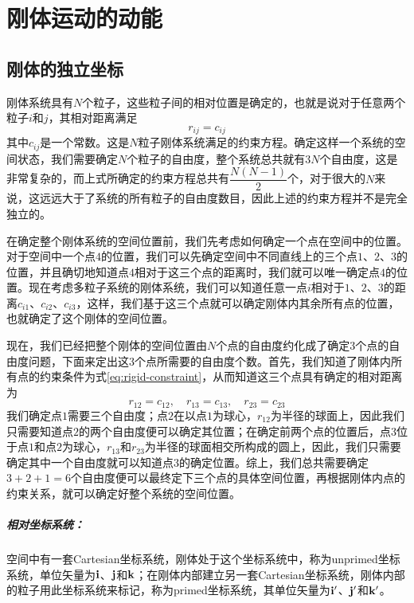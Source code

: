 \chapter{刚体运动的动能}

\section{刚体的独立坐标}

刚体系统具有$N$个粒子，这些粒子间的相对位置是确定的，也就是说对于任意两个粒子$i$和$j$，其相对距离满足
\begin{equation}
	r_{ij} = c_{ij}	\label{eq:rigid-constraint}
\end{equation} 
其中$c_{ij}$是一个常数。这是$N$粒子刚体系统满足的约束方程。确定这样一个系统的空间状态，我们需要确定$N$个粒子的自由度，整个系统总共就有$3N$个自由度，这是非常复杂的，而上式所确定的约束方程总共有$\dfrac{N(N-1)}{2}$个，对于很大的$N$来说，这远远大于了系统的所有粒子的自由度数目，因此上述的约束方程并不是完全独立的。

在确定整个刚体系统的空间位置前，我们先考虑如何确定一个点在空间中的位置。对于空间中一个点$4$的位置，我们可以先确定空间中不同直线上的三个点$1$、$2$、$3$的位置，并且确切地知道点$4$相对于这三个点的距离时，我们就可以唯一确定点$4$的位置。现在考虑多粒子系统的刚体系统，我们可以知道任意一点$i$相对于$1$、$2$、$3$的距离$c_{i1}$、$c_{i2}$、$c_{i3}$，这样，我们基于这三个点就可以确定刚体内其余所有点的位置，也就确定了这个刚体的空间位置。

现在，我们已经把整个刚体的空间位置由$N$个点的自由度约化成了确定$3$个点的自由度问题，下面来定出这$3$个点所需要的自由度个数。首先，我们知道了刚体内所有点的约束条件为式\eqref{eq:rigid-constraint}，从而知道这三个点具有确定的相对距离为
\begin{equation*}
	r_{12} = c_{12}, \quad r_{13} = c_{13}, \quad r_{23} = c_{23}
\end{equation*} 
我们确定点$1$需要三个自由度；点$2$在以点$1$为球心，$r_{12}$为半径的球面上，因此我们只需要知道点$2$的两个自由度便可以确定其位置；在确定前两个点的位置后，点$3$位于点$1$和点$2$为球心，$r_{13}$和$r_{23}$为半径的球面相交所构成的圆上，因此，我们只需要确定其中一个自由度就可以知道点$3$的确定位置。综上，我们总共需要确定$3+2+1=6$个自由度便可以最终定下三个点的具体空间位置，再根据刚体内点的约束关系，就可以确定好整个系统的空间位置。

\paragraph*{相对坐标系统：}空间中有一套Cartesian坐标系统，刚体处于这个坐标系统中，称为unprimed坐标系统，单位矢量为$\bf{i}$、$\bf{j}$和$\bf{k}$；在刚体内部建立另一套Cartesian坐标系统，刚体内部的粒子用此坐标系统来标记，称为primed坐标系统，其单位矢量为$\bf{i}^{\prime}$、$\bf{j}^{\prime}$和$\bf{k}^{\prime}$。

